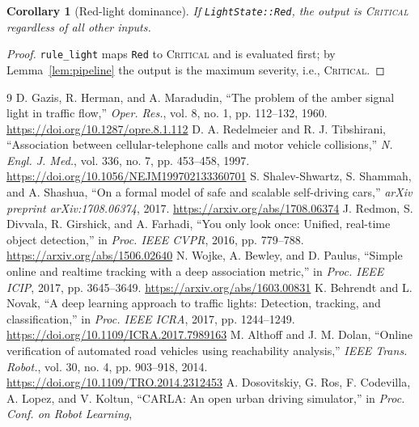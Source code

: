 \documentclass[conference, a4paper]{IEEEtran}
\theoremstyle{plain}
\newtheorem{corollary}[theorem]{Corollary}
\begin{document}
\begin{corollary}[Red-light dominance]
\label{cor:red}
If \texttt{LightState::Red}, the output is \textsc{Critical} regardless of
all other inputs.
\end{corollary}

\begin{proof}
\texttt{rule\_light} maps \texttt{Red} to \textsc{Critical} and is evaluated
first; by Lemma~\ref{lem:pipeline} the output is the maximum severity, i.e.,
\textsc{Critical}.
\end{proof}

\begin{thebibliography}{9}
D. Gazis, R. Herman, and A. Maradudin, ``The problem of the amber signal
light in traffic flow,'' \textit{Oper. Res.}, vol. 8, no. 1, pp. 112--132,
1960. \url{https://doi.org/10.1287/opre.8.1.112}
D. A. Redelmeier and R. J. Tibshirani, ``Association between
cellular-telephone calls and motor vehicle collisions,'' \textit{N. Engl. J.
Med.}, vol. 336, no. 7, pp. 453--458, 1997.
\url{https://doi.org/10.1056/NEJM199702133360701}
S. Shalev-Shwartz, S. Shammah, and A. Shashua, ``On a formal model of safe
and scalable self-driving cars,'' \textit{arXiv preprint arXiv:1708.06374},
2017. \url{https://arxiv.org/abs/1708.06374}
J. Redmon, S. Divvala, R. Girshick, and A. Farhadi, ``You only look once:
Unified, real-time object detection,'' in \textit{Proc. IEEE CVPR}, 2016,
pp. 779--788. \url{https://arxiv.org/abs/1506.02640}
N. Wojke, A. Bewley, and D. Paulus, ``Simple online and realtime tracking
with a deep association metric,'' in \textit{Proc. IEEE ICIP}, 2017,
pp. 3645--3649. \url{https://arxiv.org/abs/1603.00831}
K. Behrendt and L. Novak, ``A deep learning approach to traffic lights:
Detection, tracking, and classification,'' in \textit{Proc. IEEE ICRA}, 2017,
pp. 1244--1249. \url{https://doi.org/10.1109/ICRA.2017.7989163}
M. Althoff and J. M. Dolan, ``Online verification of automated road vehicles
using reachability analysis,'' \textit{IEEE Trans. Robot.}, vol. 30, no. 4,
pp. 903--918, 2014. \url{https://doi.org/10.1109/TRO.2014.2312453}
A. Dosovitskiy, G. Ros, F. Codevilla, A. Lopez, and V. Koltun, ``CARLA: An
open urban driving simulator,'' in \textit{Proc. Conf. on Robot Learning},

\end{thebibliography}
\end{document}
